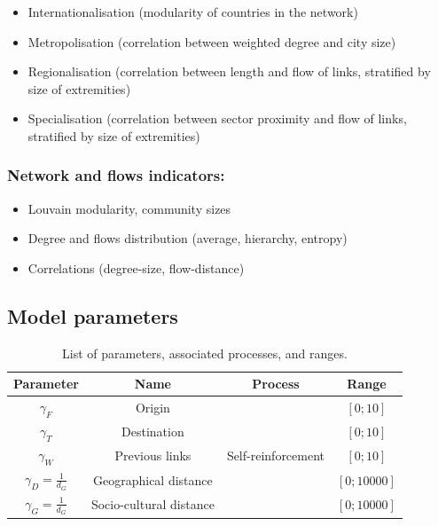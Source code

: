 \documentclass{article}
\begin{document}
\begin{itemize}
    \item Internationalisation (modularity of countries in the network)
    \item Metropolisation (correlation between weighted degree and city size)
    \item Regionalisation (correlation between length and flow of links, stratified by size of extremities)
    \item Specialisation (correlation between sector proximity and flow of links, stratified by size of extremities)
\end{itemize}


\subsubsection{Network and flows indicators:}


\begin{itemize}
    \item Louvain modularity, community sizes
    \item Degree and flows distribution (average, hierarchy, entropy)
    \item Correlations (degree-size, flow-distance)
\end{itemize}






\subsection{Model parameters}

\begin{table}
    \caption{List of parameters, associated processes, and ranges.}
    \begin{center}
    \begin{tabular}{|c|c|c|c|}
    \hline
    Parameter & Name & Process & Range \\\hline
      $\gamma_F$ & Origin &  & $\left[0;10\right]$ \\
    $\gamma_T$ & Destination & & $\left[0;10\right]$ \\
    $\gamma_W$ & Previous links & Self-reinforcement & $\left[0;10\right]$  \\
    $\gamma_D = \frac{1}{d_G}$ & Geographical distance & & $\left[0;10000\right]$ \\
    $\gamma_G  = \frac{1}{d_G}$ & Socio-cultural distance & & $\left[0;10000\right]$ \\\hline
    \end{tabular}
    \end{center}
\end{table}
\end{document}
